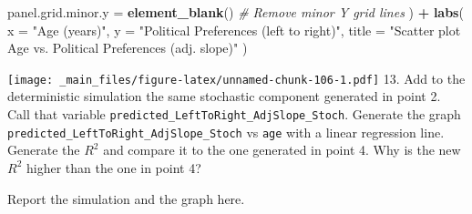 \documentclass[
]{book}
\newenvironment{Shaded}{\begin{snugshade}}{\end{snugshade}}
\newcommand{\AttributeTok}[1]{\textcolor[rgb]{0.13,0.29,0.53}{#1}}
\newcommand{\CommentTok}[1]{\textcolor[rgb]{0.56,0.35,0.01}{\textit{#1}}}
\newcommand{\FunctionTok}[1]{\textcolor[rgb]{0.13,0.29,0.53}{\textbf{#1}}}
\newcommand{\NormalTok}[1]{#1}
\newcommand{\SpecialCharTok}[1]{\textcolor[rgb]{0.81,0.36,0.00}{\textbf{#1}}}
\newcommand{\StringTok}[1]{\textcolor[rgb]{0.31,0.60,0.02}{#1}}
\begin{document}
\begin{Shaded}
\begin{Highlighting}[]
    \AttributeTok{panel.grid.minor.y =} \FunctionTok{element\_blank}\NormalTok{() }\CommentTok{\# Remove minor Y grid lines}
\NormalTok{  ) }\SpecialCharTok{+}
  \FunctionTok{labs}\NormalTok{(}
    \AttributeTok{x =} \StringTok{"Age (years)"}\NormalTok{,}
    \AttributeTok{y =} \StringTok{"Political Preferences (left to right)"}\NormalTok{,}
    \AttributeTok{title =} \StringTok{"Scatter plot Age vs. Political Preferences (adj. slope)"}
\NormalTok{  )}
\end{Highlighting}
\end{Shaded}

\texttt{[image: \_main\_files/figure-latex/unnamed-chunk-106-1.pdf]}
13. Add to the deterministic simulation the same stochastic component generated in point 2. Call that variable \texttt{predicted\_LeftToRight\_AdjSlope\_Stoch}. Generate the graph \texttt{predicted\_LeftToRight\_AdjSlope\_Stoch} vs \texttt{age} with a linear regression line. Generate the \(R^2\) and compare it to the one generated in point 4. Why is the new \(R^2\) higher than the one in point 4?

Report the simulation and the graph here.
\end{document}
